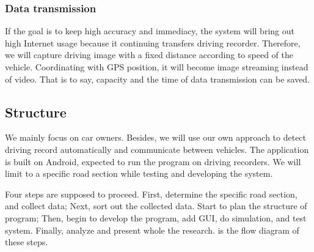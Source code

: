 \documentclass[runningheads,a4paper]{llncs}
\begin{document}
%
\subsubsection{Data transmission}
%

If the goal is to keep high accuracy and immediacy, the system will
bring out high Internet usage because it continuing transfers driving
recorder. Therefore, we will capture driving image with a fixed distance
according to speed of the vehicle. Coordinating with GPS position, it
will become image streaming instead of video. That is to say, capacity
and the time of data transmission can be saved.

%
\subsection{Structure}
%

We mainly focus on car owners. Besides, we will use our own approach to
detect driving record automatically and communicate between vehicles.
The application is built on Android, expected to run the program on
driving recorders. We will limit to a specific road section while
testing and developing the system.

Four steps are supposed to proceed. First, determine the specific road
section, and collect data; Next, sort out the collected data. Start
to plan the structure of program; Then, begin to develop the program,
add GUI, do simulation, and test system. Finally, analyze and present
whole the research.  is the flow diagram of these steps.
\end{document}
